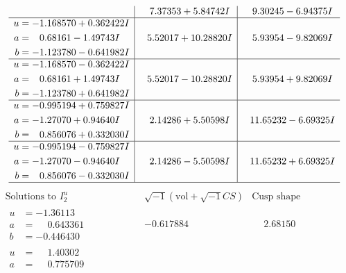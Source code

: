 \documentclass[1p]{elsarticle_modified}
\theoremstyle{definition}
\newcommand{\I}{\sqrt{-1}}
\begin{document}
$$\begin{array}{c|c|c}
 & \phantom{-}7.37353 + 5.84742 I & \phantom{-}9.30245 - 6.94375 I \\ \hline\begin{aligned}
u &= -1.168570 + 0.362422 I \\
a &= \phantom{-}0.68161 - 1.49743 I \\
b &= -1.123780 - 0.641982 I\end{aligned}
 & \phantom{-}5.52017 + 10.28820 I & \phantom{-}5.93954 - 9.82069 I \\ \hline\begin{aligned}
u &= -1.168570 - 0.362422 I \\
a &= \phantom{-}0.68161 + 1.49743 I \\
b &= -1.123780 + 0.641982 I\end{aligned}
 & \phantom{-}5.52017 - 10.28820 I & \phantom{-}5.93954 + 9.82069 I \\ \hline\begin{aligned}
u &= -0.995194 + 0.759827 I \\
a &= -1.27070 + 0.94640 I \\
b &= \phantom{-}0.856076 + 0.332030 I\end{aligned}
 & \phantom{-}2.14286 + 5.50598 I & \phantom{-}11.65232 - 6.69325 I \\ \hline\begin{aligned}
u &= -0.995194 - 0.759827 I \\
a &= -1.27070 - 0.94640 I \\
b &= \phantom{-}0.856076 - 0.332030 I\end{aligned}
 & \phantom{-}2.14286 - 5.50598 I & \phantom{-}11.65232 + 6.69325 I\\
 \hline 
 \end{array}$$\newpage$$\begin{array}{c|c|c}  
\text{Solutions to }I^u_{2}& \I (\text{vol} + \sqrt{-1}CS) & \text{Cusp shape}\\
 \hline 
\begin{aligned}
u &= -1.36113\phantom{ +0.000000I} \\
a &= \phantom{-}0.643361\phantom{ +0.000000I} \\
b &= -0.446430\phantom{ +0.000000I}\end{aligned}
 & -0.617884\phantom{ +0.000000I} & \phantom{-}2.68150\phantom{ +0.000000I} \\ \hline\begin{aligned}
u &= \phantom{-}1.40302\phantom{ +0.000000I} \\
a &= \phantom{-}0.775709\phantom{ +0.000000I} \\

\end{aligned}
\end{array}$$
\end{document}
